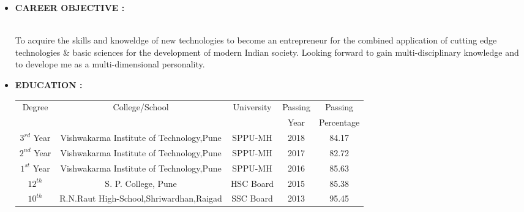 \documentclass[11pt]{article}
\begin{document}
\begin{itemize}[label=$\star$]  
	\item \begin{large} \textbf{CAREER OBJECTIVE :} \end{large}\\
	
	To acquire the skills and knoweldge of new technologies to become an entrepreneur for the combined application of  cutting edge technologies \& basic sciences for the development of modern Indian society. Looking forward to gain multi-disciplinary knowledge and to develope me as a multi-dimensional personality.
	 \bigskip
	\item \begin{large} \textbf{EDUCATION :} \end{large}
	\begin{flushleft}
		\begin{tabular}{|c|c|c|c|c|}
			\hline
			\multirow{2}{*}{Degree} &\multirow{2}{*}{College/School} &\multirow{2}{*}{University} &Passing  &Passing \\ 
			&                                &			                   &Year	& Percentage\\ \hline	    			
			$3^{rd}$ Year &Vishwakarma Institute of Technology,Pune &SPPU-MH   &2018 &84.17 \\ \hline
			$2^{nd}$ Year &Vishwakarma Institute of Technology,Pune &SPPU-MH   &2017 &82.72 \\ \hline
			$1^{st}$ Year &Vishwakarma Institute of Technology,Pune &SPPU-MH   &2016 &85.63 \\ \hline
			$12^{th}$     &S. P. College, Pune                      &HSC Board &2015 &85.38 \\ \hline
			$10^{th}$     &R.N.Raut High-School,Shriwardhan,Raigad  &SSC Board &2013 &95.45 \\ \hline
		\end{tabular}
	\end{flushleft}
	

\end{itemize}
\end{document}
